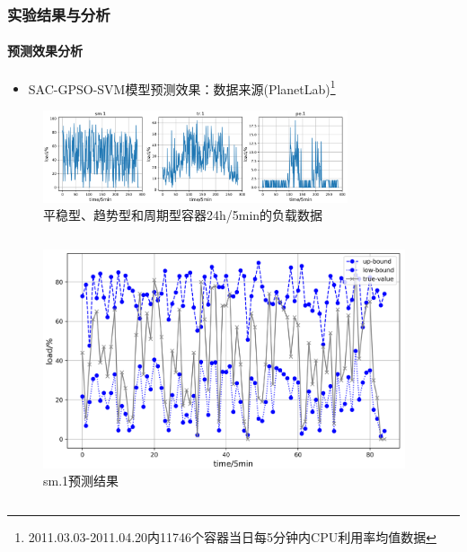 \begin{frame}
\frametitle{实验结果与分析}
\framesubtitle{预测效果分析}
\begin{itemize}
    \item SAC-GPSO-SVM模型预测效果：数据来源(PlanetLab)\footnote{\tiny{2011.03.03-2011.04.20内11746个容器当日每5分钟内CPU利用率均值数据}}
\end{itemize}
\begin{minipage}{\textwidth}
    \centering
    \begin{figure}[htb]
    \centering
    \includegraphics[width=0.8\textwidth]{figures/fig10_data_of_sm_tr_pe.png}
    \caption{平稳型、趋势型和周期型容器24h/5min的负载数据}
    \label{fig:fig10}
    \end{figure}
\end{minipage}
\begin{columns}[T,onlytextwidth]
\begin{column}{0.3\textwidth}
    \begin{minipage}{\textwidth}
        \begin{figure}
        \centering
        \includegraphics[width=\textwidth]{figures/fig11_a_sm_predict.png}
        \caption{sm.1预测结果}
        \label{fig:fig11_a}
        \end{figure}
    \end{minipage}
\end{column}
\begin{column}{0.3\textwidth}

\end{column}
\end{columns}
\end{frame}
